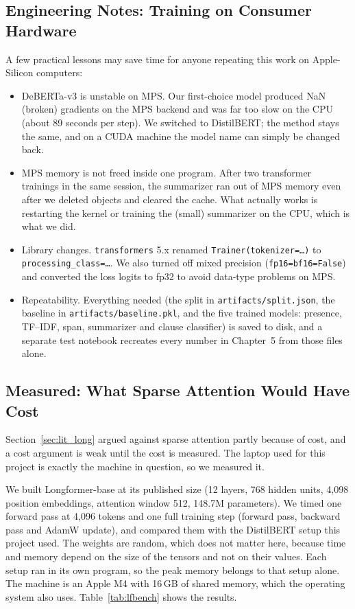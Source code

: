 \subsection{Engineering Notes: Training on Consumer Hardware}
\label{sec:engineering}
A few practical lessons may save time for anyone repeating this work on Apple-Silicon computers:
\begin{itemize}[itemsep=2pt]
  \item DeBERTa-v3 is unstable on MPS. Our first-choice model produced NaN (broken) gradients on the MPS backend and was far too slow on the CPU (about 89 seconds per step). We switched to DistilBERT; the method stays the same, and on a CUDA machine the model name can simply be changed back.
  \item MPS memory is not freed inside one program. After two transformer trainings in the same session, the summarizer ran out of MPS memory even after we deleted objects and cleared the cache. What actually works is restarting the kernel or training the (small) summarizer on the CPU, which is what we did.
  \item Library changes. \texttt{transformers} 5.x renamed \texttt{Trainer(tokenizer=\dots)} to \texttt{processing\_class=\dots}. We also turned off mixed precision (\texttt{fp16=bf16=False}) and converted the loss logits to fp32 to avoid data-type problems on MPS.
  \item Repeatability. Everything needed (the split in \texttt{artifacts/split.json}, the baseline in \texttt{artifacts/baseline.pkl}, and the five trained models: presence, TF--IDF, span, summarizer and clause classifier) is saved to disk, and a separate test notebook recreates every number in Chapter~5 from those files alone.
\end{itemize}
\subsection{Measured: What Sparse Attention Would Have Cost}
\label{sec:lfbench}
Section~\ref{sec:lit_long} argued against sparse attention partly because of cost, and a cost argument is weak until the cost is measured. The laptop used for this project is exactly the machine in question, so we measured it.

We built Longformer-base at its published size (12 layers, 768 hidden units, 4{,}098 position embeddings, attention window 512, 148.7M parameters). We timed one forward pass at 4{,}096 tokens and one full training step (forward pass, backward pass and AdamW update), and compared them with the DistilBERT setup this project used. The weights are random, which does not matter here, because time and memory depend on the size of the tensors and not on their values. Each setup ran in its own program, so the peak memory belongs to that setup alone. The machine is an Apple M4 with 16\,GB of shared memory, which the operating system also uses. Table~\ref{tab:lfbench} shows the results.

